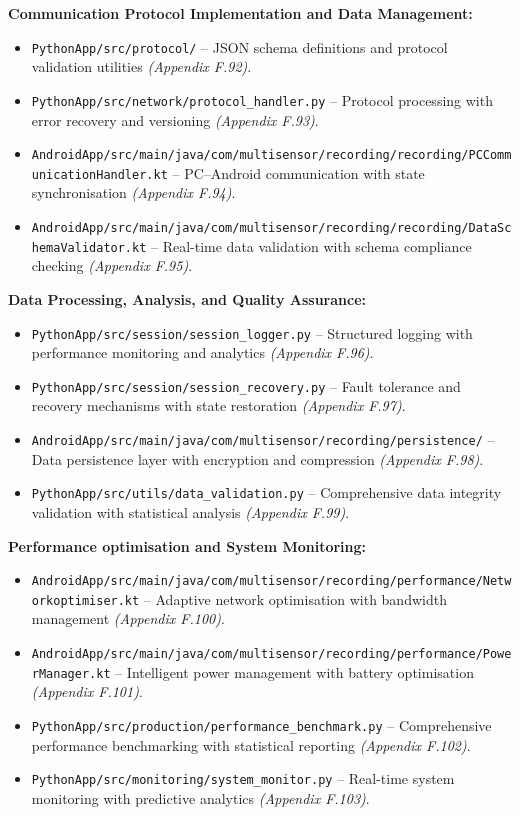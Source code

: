 \documentclass[11pt,a4paper]{report}
\begin{document}
\textbf{Communication Protocol Implementation and Data Management:}
\begin{itemize}
  \item \texttt{PythonApp/src/protocol/} – JSON schema definitions and protocol validation utilities \textit{(Appendix F.92)}.
  \item \texttt{PythonApp/src/network/protocol\_handler.py} – Protocol processing with error recovery and versioning \textit{(Appendix F.93)}.
  \item \texttt{AndroidApp/src/main/java/com/multisensor/recording/recording/PCCommunicationHandler.kt} – PC–Android communication with state synchronisation \textit{(Appendix F.94)}.
  \item \texttt{AndroidApp/src/main/java/com/multisensor/recording/recording/DataSchemaValidator.kt} – Real-time data validation with schema compliance checking \textit{(Appendix F.95)}.
\end{itemize}

\textbf{Data Processing, Analysis, and Quality Assurance:}
\begin{itemize}
  \item \texttt{PythonApp/src/session/session\_logger.py} – Structured logging with performance monitoring and analytics \textit{(Appendix F.96)}.
  \item \texttt{PythonApp/src/session/session\_recovery.py} – Fault tolerance and recovery mechanisms with state restoration \textit{(Appendix F.97)}.
  \item \texttt{AndroidApp/src/main/java/com/multisensor/recording/persistence/} – Data persistence layer with encryption and compression \textit{(Appendix F.98)}.
  \item \texttt{PythonApp/src/utils/data\_validation.py} – Comprehensive data integrity validation with statistical analysis \textit{(Appendix F.99)}.
\end{itemize}

\textbf{Performance optimisation and System Monitoring:}
\begin{itemize}
  \item \texttt{AndroidApp/src/main/java/com/multisensor/recording/performance/Networkoptimiser.kt} – Adaptive network optimisation with bandwidth management \textit{(Appendix F.100)}.
  \item \texttt{AndroidApp/src/main/java/com/multisensor/recording/performance/PowerManager.kt} – Intelligent power management with battery optimisation \textit{(Appendix F.101)}.
  \item \texttt{PythonApp/src/production/performance\_benchmark.py} – Comprehensive performance benchmarking with statistical reporting \textit{(Appendix F.102)}.
  \item \texttt{PythonApp/src/monitoring/system\_monitor.py} – Real-time system monitoring with predictive analytics \textit{(Appendix F.103)}.
\end{itemize}
\end{document}

